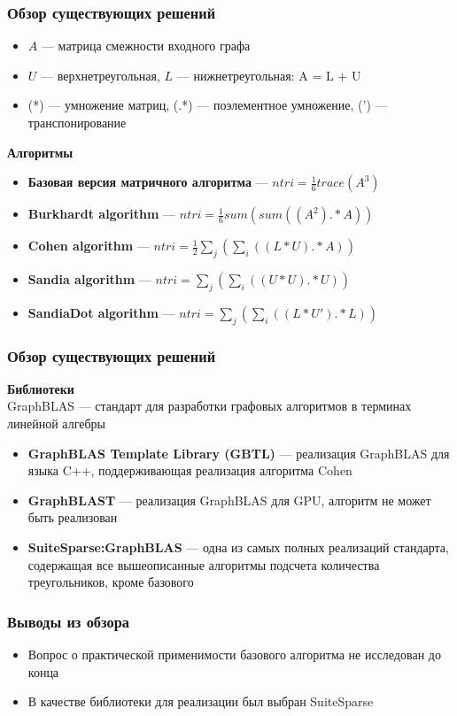 \documentclass{beamer}
\begin{document}
\begin{frame}
  \transwipe[direction=90]
  \frametitle{Обзор существующих решений}
  \begin{itemize}
      \item $A$ --- матрица смежности входного графа
      \item $U$ --- верхнетреугольная, $L$ --- нижнетреугольная: A = L + U
      \item (*) --- умножение матриц, (.*) --- поэлементное умножение, (') --- транспонирование
  \end{itemize}
  \textbf{Алгоритмы}
  \begin{itemize}
    \item \textbf{Базовая версия матричного алгоритма} --- $ntri = \frac{1}{6}trace(A^{3})$
    \item \textbf{Burkhardt algorithm} --- $ntri = \frac{1}{6} sum (sum ((A^{2}) .* A))$
    \item \textbf{Cohen algorithm} --- $ntri = \frac{1}{2}\sum\limits_j (\sum\limits_i ((L * U) .* A))$
    \item \textbf{Sandia algorithm} --- $ntri = \sum\limits_j (\sum\limits_i ((U * U) .* U))$
    \item \textbf{SandiaDot algorithm} --- $ntri = \sum\limits_j (\sum\limits_i ((L * U') .* L))$
  \end{itemize}
  \end{frame}
  
\begin{frame}
  \transwipe[direction=90]
  \frametitle{Обзор существующих решений}
  \textbf{Библиотеки}\\
  GraphBLAS ---  стандарт для разработки графовых алгоритмов в терминах линейной алгебры
  \begin{itemize}
    \item \textbf{GraphBLAS Template Library (GBTL)} --- реализация GraphBLAS для языка C++, поддерживающая реализация алгоритма Cohen
    \item \textbf{GraphBLAST} --- реализация GraphBLAS для GPU, алгоритм не может быть реализован
    \item \textbf{SuiteSparse:GraphBLAS} --- одна из самых полных реализаций стандарта, содержащая все вышеописанные алгоритмы подсчета количества треугольников, кроме базового
  \end{itemize}
  \end{frame}
  
\begin{frame}
  \transwipe[direction=90]
    \frametitle{Выводы из обзора}
    \begin{itemize}
      \item Вопрос о практической применимости базового алгоритма не исследован до конца
      \item В качестве библиотеки для реализации был выбран SuiteSparse
    \end{itemize}
\end{frame}
\end{document}
